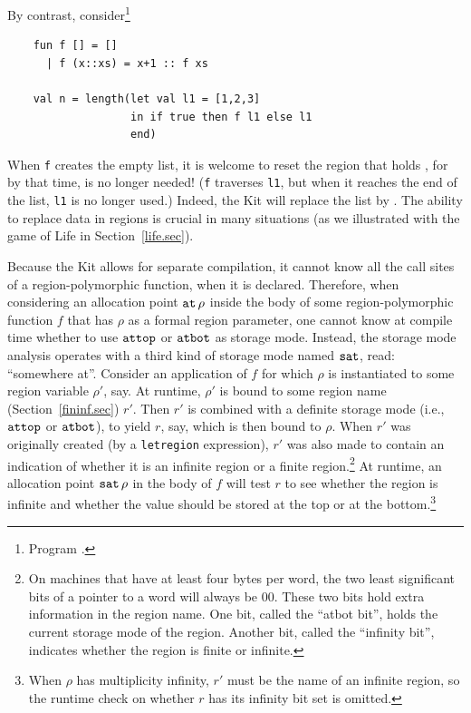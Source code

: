 \documentclass[12pt]{book}
\begin{document}
By contrast, consider\footnote{Program .}
\begin{verbatim}
    fun f [] = []
      | f (x::xs) = x+1 :: f xs

    val n = length(let val l1 = [1,2,3]
                   in if true then f l1 else l1
                   end)
\end{verbatim}
When {\tt f} creates the empty list, it is welcome to reset the region that
holds , for by that time,  is
no longer needed! ({\tt f} traverses {\tt l1}, but when it reaches the
end of the list, {\tt l1} is no longer used.)  Indeed, the Kit will
replace the list \boxml{[1,2,3]} by \boxml{[2,3,4]}. The ability
to replace data in regions is crucial in many situations (as we
illustrated with the game of Life in Section~\ref{life.sec}).

Because the Kit allows for separate compilation, it cannot know all
the call sites of a region-polymorphic function, when it is declared.
Therefore, when considering an allocation point $\mathbin{\hbox{\tt at}}\,\rho$ inside the
body of some region-polymorphic function $f$ that has $\rho$ as a
formal region parameter, one cannot know at compile time whether to
use $\hbox{\tt attop}$ or $\hbox{\tt atbot}$ as storage mode.  Instead, the storage mode
analysis operates with a third kind of storage mode named $\hbox{\tt sat}$,
read: ``somewhere at''. Consider an application of $f$ for which
$\rho$ is instantiated to some region variable $\rho'$, say. At
runtime, $\rho'$ is bound to some region name
(Section~\ref{fininf.sec}) $r'$.  Then $r'$ is combined with a
definite storage mode (i.e., $\hbox{\tt attop}$ or $\hbox{\tt atbot}$), to yield $r$, say,
which is then bound to $\rho$.  When $r'$ was originally created (by a
{\tt letregion} expression), $r'$ was also made to contain an
indication of whether it is an infinite region or a finite
region.\footnote{On machines\label{atbit.lab} that have at least four
  bytes per word, the two least significant bits of a pointer to a
  word will always be 00. These two bits hold extra information in the
  region name.  One bit, called the ``atbot bit'', holds the current
  storage mode of the region. Another bit, called the ``infinity
  bit'', indicates whether the region is finite or infinite.}  At
runtime, an allocation point $\hbox{\tt sat}\,\rho$ in the body of $f$ will test
$r$ to see whether the region is infinite and whether the value should
be stored at the top or at the bottom.\footnote{When $\rho$ has
  multiplicity infinity, $r'$ must be the name of an infinite region,
  so the runtime check on whether $r$ has its infinity bit set is
  omitted.}
\end{document}
